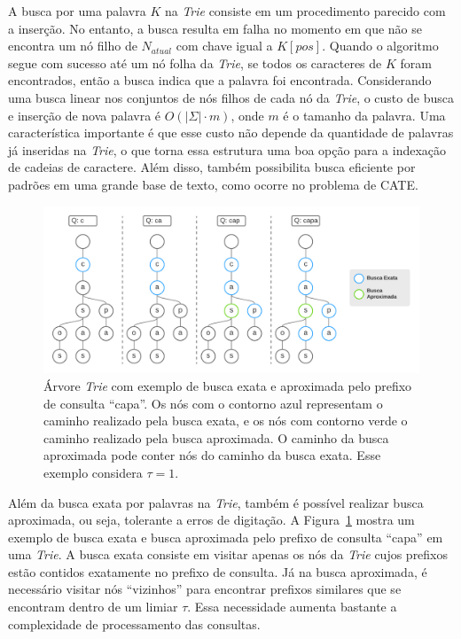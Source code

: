 A busca por uma palavra $K$ na \textit{Trie} consiste em um procedimento parecido com a inserção. No entanto, a busca resulta em falha no momento em que não se encontra um nó filho de $N_{atual}$ com chave igual a $K[pos]$. Quando o algoritmo segue com sucesso até um nó folha da \textit{Trie}, se todos os caracteres de $K$ foram encontrados, então a busca indica que a palavra foi encontrada. Considerando uma busca linear nos conjuntos de nós filhos de cada nó da \textit{Trie}, o custo de busca e inserção de nova palavra é $O(|\Sigma| \cdot m)$, onde $m$ é o tamanho da palavra. Uma característica importante é que esse custo não depende da quantidade de palavras já inseridas na \textit{Trie}, o que torna essa estrutura uma boa opção para a indexação de cadeias de caractere. Além disso, também possibilita busca eficiente por padrões em uma grande base de texto, como ocorre no problema de CATE.

\begin{figure}[ht]
    \centering
    \includegraphics[width=1\textwidth]{figures/trie_exact_and_approximate_search.png}
    \caption{Árvore \textit{Trie} com exemplo de busca exata e aproximada pelo prefixo de consulta ``capa''. Os nós com o contorno azul representam o caminho realizado pela busca exata, e os nós com contorno verde o caminho realizado pela busca aproximada. O caminho da busca aproximada pode conter nós do caminho da busca exata. Esse exemplo considera $\tau = 1$. }
    \label{fig:exact_and_approximate_search_trie}
\end{figure}

Além da busca exata por palavras na \textit{Trie}, também é possível realizar busca aproximada, ou seja, tolerante a erros de digitação. A Figura~\ref{fig:exact_and_approximate_search_trie} mostra um exemplo de busca exata e busca aproximada pelo prefixo de consulta ``capa'' em uma \textit{Trie}. A busca exata consiste em visitar apenas os nós da \textit{Trie} cujos prefixos estão contidos exatamente no prefixo de consulta. Já na busca aproximada, é necessário visitar nós ``vizinhos'' para encontrar prefixos similares que se encontram dentro de um limiar $\tau$. Essa necessidade aumenta bastante a complexidade de processamento das consultas.

